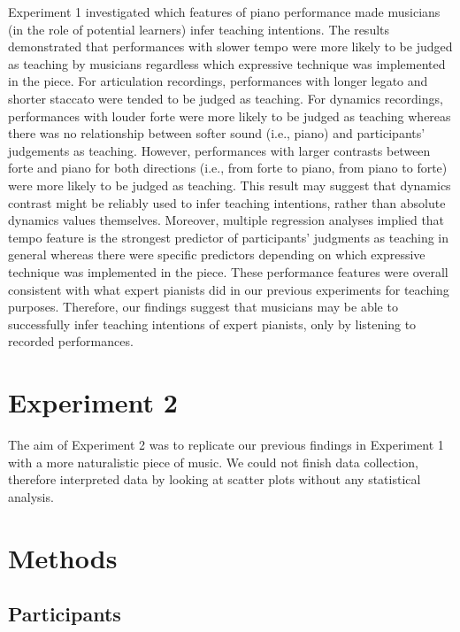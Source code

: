 \documentclass[
  man,floatsintext]{apa6}
\begin{document}
Experiment 1 investigated which features of piano performance made musicians (in the role of potential learners) infer teaching intentions. The results demonstrated that performances with slower tempo were more likely to be judged as teaching by musicians regardless which expressive technique was implemented in the piece. For articulation recordings, performances with longer legato and shorter staccato were tended to be judged as teaching. For dynamics recordings, performances with louder forte were more likely to be judged as teaching whereas there was no relationship between softer sound (i.e., piano) and participants' judgements as teaching. However, performances with larger contrasts between forte and piano for both directions (i.e., from forte to piano, from piano to forte) were more likely to be judged as teaching. This result may suggest that dynamics contrast might be reliably used to infer teaching intentions, rather than absolute dynamics values themselves. Moreover, multiple regression analyses implied that tempo feature is the strongest predictor of participants' judgments as teaching in general whereas there were specific predictors depending on which expressive technique was implemented in the piece. These performance features were overall consistent with what expert pianists did in our previous experiments for teaching purposes. Therefore, our findings suggest that musicians may be able to successfully infer teaching intentions of expert pianists, only by listening to recorded performances.

\clearpage

\hypertarget{experiment-2}{%
\section{Experiment 2}\label{experiment-2}}

The aim of Experiment 2 was to replicate our previous findings in Experiment 1 with a more naturalistic piece of music. We could not finish data collection, therefore interpreted data by looking at scatter plots without any statistical analysis.

\hypertarget{methods-1}{%
\section{Methods}\label{methods-1}}

\hypertarget{participants-1}{%
\subsection{Participants}\label{participants-1}}
\end{document}
